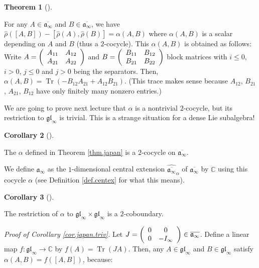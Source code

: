 \documentclass
[numbers=enddot,12pt,final,onecolumn,german,notitlepage]{scrartcl}%
\theoremstyle{definition}
\newtheorem{theo}{Theorem}
\newenvironment{theorem}[1][]
{\begin{theo}[#1]\begin{leftbar}}
{\end{leftbar}\end{theo}}
\newtheorem{coro}[theo]{Corollary}
\newenvironment{corollary}[1][]
{\begin{coro}[#1]\begin{leftbar}}
{\end{leftbar}\end{coro}}
\begin{document}
\begin{theorem}
\label{thm.japan}For any $A\in\overline{\mathfrak{a}_{\infty}}$ and
$B\in\overline{\mathfrak{a}_{\infty}}$, we have $\widehat{\rho}\left(  \left[
A,B\right]  \right)  -\left[  \widehat{\rho}\left(  A\right)  ,\widehat{\rho
}\left(  B\right)  \right]  =\alpha\left(  A,B\right)  $ where $\alpha\left(
A,B\right)  $ is a scalar depending on $A$ and $B$ (thus a $2$-cocycle). This
$\alpha\left(  A,B\right)  $ is obtained as follows: Write $A=\left(
\begin{array}
[c]{cc}%
A_{11} & A_{12}\\
A_{21} & A_{22}%
\end{array}
\right)  $ and $B=\left(
\begin{array}
[c]{cc}%
B_{11} & B_{12}\\
B_{21} & B_{22}%
\end{array}
\right)  $ block matrices with $i\leq0$, $i>0$, $j\leq0$ and $j>0$ being the
separators. Then, $\alpha\left(  A,B\right)  =\operatorname*{Tr}\left(
-B_{12}A_{21}+A_{12}B_{21}\right)  $. (This trace makes sense because $A_{12}%
$, $B_{21}$, $A_{21}$, $B_{12}$ have only finitely many nonzero entries.)
\end{theorem}

We are going to prove next lecture that $\alpha$ is a nontrivial $2$-cocycle,
but its restriction to $\mathfrak{gl}_{\infty}$ is trivial. This is a strange
situation for a dense Lie subalgebra!

\begin{corollary}
The $\alpha$ defined in Theorem \ref{thm.japan} is a $2$-cocycle on
$\overline{\mathfrak{a}_{\infty}}$.

We define $\mathfrak{a}_{\infty}$ as the $1$-dimensional central extension
$\widehat{\overline{\mathfrak{a}_{\infty}}}_{\alpha}$ of $\overline
{\mathfrak{a}_{\infty}}$ by $\mathbb{C}$ using this cocycle $\alpha$ (see
Definition \ref{def.centex} for what this means).
\end{corollary}

\begin{corollary}
\label{cor.japan.triv}The restriction of $\alpha$ to $\mathfrak{gl}_{\infty
}\times\mathfrak{gl}_{\infty}$ is a $2$-coboundary.
\end{corollary}

\textit{Proof of Corollary \ref{cor.japan.triv}.} Let $J=\left(
\begin{array}
[c]{cc}%
0 & 0\\
0 & -I_{\infty}%
\end{array}
\right)  \in\overline{\mathfrak{a}_{\infty}}$. Define a linear map
$f:\mathfrak{gl}_{\infty}\rightarrow\mathbb{C}$ by $f\left(  A\right)
=\operatorname*{Tr}\left(  JA\right)  $. Then, any $A\in\mathfrak{gl}_{\infty
}$ and $B\in\mathfrak{gl}_{\infty}$ satisfy $\alpha\left(  A,B\right)
=f\left(  \left[  A,B\right]  \right)  $, because:
\end{document}
